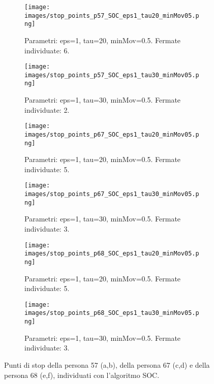 \documentclass[12pt]{article}
\begin{document}
\begin{figure}[htb!]
    \centering
    \begin{subfigure}[b]{0.45\textwidth}
        \centering
        \texttt{[image: images/stop\_points\_p57\_SOC\_eps1\_tau20\_minMov05.png]}
        \caption{Parametri: eps=1, tau=20, minMov=0.5. Fermate individuate: 6.}
        \label{stop_points_p57_SOC_eps1_tau20_minMov05}
    \end{subfigure}
    \hfill
    \begin{subfigure}[b]{0.45\textwidth}
        \centering
        \texttt{[image: images/stop\_points\_p57\_SOC\_eps1\_tau30\_minMov05.png]}
        \caption{Parametri: eps=1, tau=30, minMov=0.5. Fermate individuate: 2.}
        \label{stop_points_p57_SOC_eps1_tau30_minMov05}
    \end{subfigure}
    \hfill
    \begin{subfigure}[b]{0.45\textwidth}
        \centering
        \texttt{[image: images/stop\_points\_p67\_SOC\_eps1\_tau20\_minMov05.png]}
        \caption{Parametri: eps=1, tau=20, minMov=0.5. Fermate individuate: 5.}
        \label{stop_points_p67_SOC_eps1_tau20_minMov05}
    \end{subfigure}
    \hfill
    \begin{subfigure}[b]{0.45\textwidth}
        \centering
        \texttt{[image: images/stop\_points\_p67\_SOC\_eps1\_tau30\_minMov05.png]}
        \caption{Parametri: eps=1, tau=30, minMov=0.5. Fermate individuate: 3.}
        \label{stop_points_p67_SOC_eps1_tau30_minMov05}
    \end{subfigure}
    \hfill
    \begin{subfigure}[b]{0.45\textwidth}
        \centering
        \texttt{[image: images/stop\_points\_p68\_SOC\_eps1\_tau20\_minMov05.png]}
        \caption{Parametri: eps=1, tau=20, minMov=0.5. Fermate individuate: 5.}
        \label{stop_points_p68_SOC_eps1_tau20_minMov05}
    \end{subfigure}
    \hfill
    \begin{subfigure}[b]{0.45\textwidth}
        \centering
        \texttt{[image: images/stop\_points\_p68\_SOC\_eps1\_tau30\_minMov05.png]}
        \caption{Parametri: eps=1, tau=30, minMov=0.5. Fermate individuate: 3.}
        \label{stop_points_p68_SOC_eps1_tau30_minMov05}
    \end{subfigure}
    \hfill
    \caption{Punti di stop della persona 57 (a,b), della persona 67 (c,d) e della persona 68 (e,f), individuati con l'algoritmo SOC.}
    \label{stop_points_SOC}
\end{figure}
\end{document}
